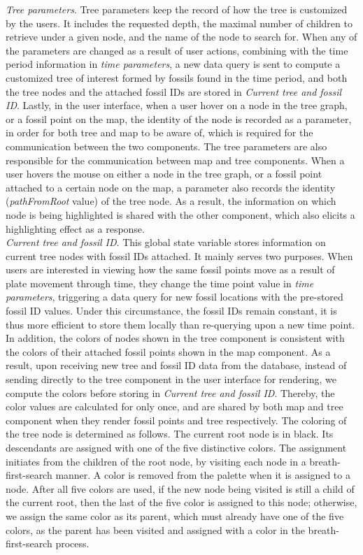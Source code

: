\documentclass[11pt, a4paper,oneside,chapterprefix=false]{scrbook}
\begin{document}
\emph{Tree parameters}. Tree parameters keep the record of how the tree is customized by the users. It includes the requested depth, the maximal number of children to retrieve under a given node, and the name of the node to search for. When any of the parameters are changed as a result of user actions, combining with the time period information in \emph{time parameters}, a new data query is sent to compute a customized tree of interest formed by fossils found in the time period, and both the tree nodes and the attached fossil IDs are stored in \emph{Current tree and fossil ID}. Lastly, in the user interface, when a user hover on a node in the tree graph, or a fossil point on the map, the identity of the node is recorded as a parameter, in order for both tree and map to be aware of, which is required for the communication between the two components. The tree parameters are also responsible for the communication between map and tree components. When a user hovers the mouse on either a node in the tree graph, or a fossil point attached to a certain node on the map, a parameter also records the identity (\emph{pathFromRoot} value) of the tree node. As a result, the information on which node is being highlighted is shared with the other component, which also elicits a highlighting effect as a response. \\

\emph{Current tree and fossil ID}. This global state variable stores information on current tree nodes with fossil IDs attached. It mainly serves two purposes. When users are interested in viewing how the same fossil points move as a result of plate movement through time, they change the time point value in \emph{time parameters}, triggering a data query for new fossil locations with the pre-stored fossil ID values. Under this circumstance, the fossil IDs remain constant, it is thus more efficient to store them locally than re-querying upon a new time point. In addition, the colors of nodes shown in the tree component is consistent with the colors of their attached fossil points shown in the map component. As a result, upon receiving new tree and fossil ID data from the database, instead of sending directly to the tree component in the user interface for rendering, we compute the colors before storing in \emph{Current tree and fossil ID}. Thereby, the color values are calculated for only once, and are shared by both map and tree component when they render fossil points and tree respectively. The coloring of the tree node is determined as follows. The current root node is in black. Its descendants are assigned with one of the five distinctive colors. The assignment initiates from the children of the root node, by visiting each node in a breath-first-search manner. A color is removed from the palette when it is assigned to a node. After all five colors are used, if the new node being visited is still a child of the current root, then the last of the five color is assigned to this node; otherwise, we assign the same color as its parent, which must already have one of the five colors, as the parent has been visited and assigned with a color in the breath-first-search process. 
\end{document}
